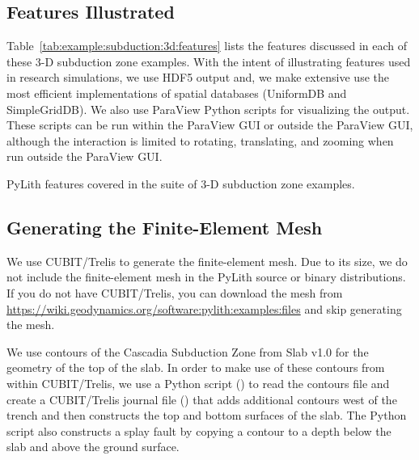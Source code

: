 \subsection{Features Illustrated}

Table~\vref{tab:example:subduction:3d:features} lists the features
discussed in each of these 3-D subduction zone examples. With the
intent of illustrating features used in research simulations, we use
HDF5 output and, we make extensive use the most efficient
implementations of spatial databases (UniformDB and SimpleGridDB). We
also use ParaView Python scripts for visualizing the output. These
scripts can be run within the ParaView GUI or outside the ParaView
GUI, although the interaction is limited to rotating, translating, and
zooming when run outside the ParaView GUI.

\begin{table}[htbp]
  \caption{PyLith features covered in the suite of 3-D subduction zone examples.}
  \label{tab:example:subduction:3d:features}
  
\end{table}

\subsection{Generating the Finite-Element Mesh}

We use CUBIT/Trelis to generate the finite-element mesh. Due to its
size, we do not include the finite-element mesh in the PyLith source
or binary distributions. If you do not have CUBIT/Trelis, you can
download the mesh from
\url{https://wiki.geodynamics.org/software:pylith:examples:files} and
skip generating the mesh.

We use contours of the Cascadia Subduction Zone from Slab v1.0
\cite{Hayes:etal:2012} for the geometry of the top of the slab. In
order to make use of these contours from within CUBIT/Trelis, we use a
Python script () to read the contours
file and create a CUBIT/Trelis journal file
() that adds additional contours west of
the trench and then constructs the top and bottom surfaces of the
slab. The Python script also constructs a splay fault by copying a
contour to a depth below the slab and above the ground surface.


